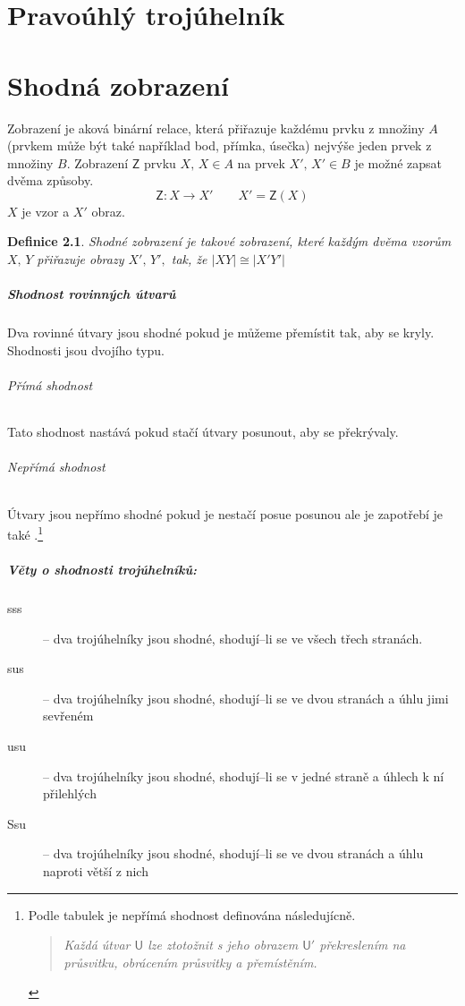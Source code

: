 \documentclass[12pt,a4wide,oneside,
headings]{report}
\newtheorem{defi}{Definice}[chapter]\theoremstyle{definition}
\begin{document}
\chapter{Pravoúhlý trojúhelník}
\chapter{Shodná zobrazení}

Zobrazení je aková binární relace, která přiřazuje každému prvku z množiny $A$ (prvkem může být také například bod, přímka, úsečka) nejvýše jeden prvek z množiny $B$. Zobrazení $\mathsf{Z}$ prvku $X, \, X\in A$ na prvek $X', \, X'\in B$ je možné zapsat dvěma způsoby. $$ \mathsf{Z}: X\rightarrow X'\qquad X'=\mathsf{Z}(X)$$
$X$ je vzor a $X'$ obraz.
\begin{defi} Shodné zobrazení
je takové zobrazení, které každým dvěma vzorům $X,\,Y$ přiřazuje obrazy $X',\,Y',$ tak, že $\left|XY \right| \cong\left|X'Y' \right|$ 
\end{defi}

\paragraph{Shodnost rovinných útvarů} Dva rovinné útvary jsou shodné pokud je můžeme přemístit tak, aby se kryly. Shodnosti jsou dvojího typu.
\subparagraph{Přímá shodnost} Tato shodnost nastává pokud stačí útvary posunout, aby se překrývaly.
\subparagraph{Nepřímá shodnost} Útvary jsou nepřímo shodné pokud  je nestačí posue posunou ale je zapotřebí je také .\footnote{Podle tabulek je nepřímá shodnost definována následujícně. \begin{quote}
\emph{Každá útvar $\mathsf{U}$ lze ztotožnit s jeho obrazem $\mathsf{U'}$ překreslením na průsvitku, obrácením průsvitky a přemístěním.}
\end{quote}}

\paragraph{Věty o shodnosti trojúhelníků:} 
\begin{multicols}{2}
\begin{description}
\item[sss] --  dva trojúhelníky jsou shodné, shodují–li se ve všech třech stranách.
\item[sus] --  dva trojúhelníky jsou shodné, shodují–li se ve dvou stranách a úhlu jimi sevřeném
\item[usu] -- dva trojúhelníky jsou shodné, shodují–li se v jedné straně a úhlech k ní přilehlých
\item[Ssu] -- dva trojúhelníky jsou shodné, shodují–li se ve dvou stranách a úhlu naproti větší z nich
\end{description}
\end{multicols}
\end{document}

